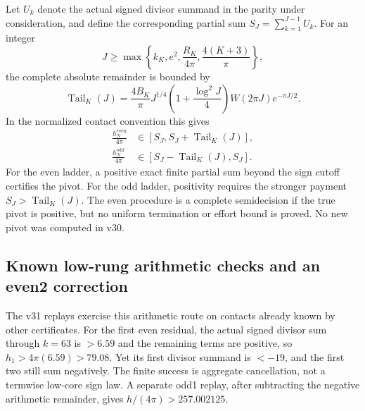 \documentclass[11pt]{article}
\theoremstyle{definition}
\theoremstyle{remark}
\begin{document}
Let $U_k$ denote the actual signed divisor summand in the parity under
consideration, and define the corresponding partial sum
$S_J=\sum_{k=1}^{J-1}U_k$. For an integer
\begin{equation}
 J\ge\max\left\{k_K,e^2,\frac{R_K}{4\pi},
                         \frac{4(K+3)}{\pi}\right\},
\end{equation}
the complete absolute remainder is bounded by
\begin{equation}
 \operatorname{Tail}_K(J)=\frac{4B_K}{\pi}J^{1/4}
 \left(1+\frac{\log^2J}{4}\right)
 W(2\pi J)e^{-\pi J/2}.
 \label{eq:arithmetic-tail-payment}
\end{equation}
In the normalized contact convention this gives
\begin{align}
 \frac{h_N^{\mathrm{even}}}{4\pi}
   &\in[S_J,S_J+\operatorname{Tail}_K(J)],\nonumber\\
 \frac{h_N^{\mathrm{odd}}}{4\pi}
   &\in[S_J-\operatorname{Tail}_K(J),S_J].
 \label{eq:twin-tail-enclosures}
\end{align}
For the even ladder, a positive exact finite partial sum beyond the sign cutoff
certifies the pivot. For the odd ladder, positivity requires the stronger
payment $S_J>\operatorname{Tail}_K(J)$. The even procedure is a complete
semidecision if the true pivot is positive, but no uniform termination or
effort bound is proved. No new pivot was computed in v30.

\subsection{Known low-rung arithmetic checks and an even2 correction}

The v31 replays exercise this arithmetic route on contacts already known by
other certificates. For the first even residual, the actual signed divisor sum
through $k=63$ is $>6.59$ and the remaining terms are positive, so
$h_1>4\pi(6.59)>79.08$. Yet its first divisor summand is $<-19$, and the first
two still sum negatively. The finite success is aggregate cancellation, not a
termwise low-core sign law. A separate odd1 replay, after subtracting the
negative arithmetic remainder, gives $h/(4\pi)>257.002125$.
\end{document}
